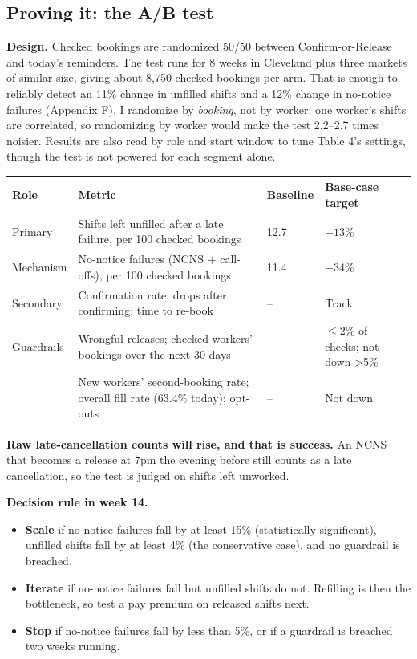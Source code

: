 \documentclass[11pt]{article}
\begin{document}
\subsection{Proving it: the A/B test}

\textbf{Design.} Checked bookings are randomized 50/50 between Confirm-or-Release and today's reminders. The test runs
for 8 weeks in Cleveland plus three markets of similar size, giving about 8,750 checked bookings per arm. That is enough
to reliably detect an 11\% change in unfilled shifts and a 12\% change in no-notice failures (Appendix F). I randomize by
\emph{booking}, not by worker: one worker's shifts are correlated, so randomizing by worker would make the test
2.2--2.7 times noisier. Results are also read by role and start window to tune Table 4's settings, though the test is
not powered for each segment alone.

\begin{center}\small
{}
\begin{tabularx}{\textwidth}{@{}lLR{1.4cm}R{2.6cm}@{}}
\toprule
Role & Metric & Baseline & Base-case target \\
\midrule
Primary & Shifts left unfilled after a late failure, per 100 checked bookings & 12.7 & $-13\%$ \\
Mechanism & No-notice failures (NCNS + call-offs), per 100 checked bookings & 11.4 & $-34\%$ \\
Secondary & Confirmation rate; drops after confirming; time to re-book & -- & Track \\
Guardrails & Wrongful releases; checked workers' bookings over the next 30 days & -- & $\le$2\% of checks; not down
\textgreater5\% \\
 & New workers' second-booking rate; overall fill rate (63.4\% today); opt-outs & -- & Not down \\
\bottomrule
\end{tabularx}
\end{center}

\textbf{Raw late-cancellation counts will rise, and that is success.} An NCNS that becomes a release at 7pm the evening
before still counts as a late cancellation, so the test is judged on shifts left unworked.

\textbf{Decision rule in week 14.}
\begin{itemize}
  \item \textbf{Scale} if no-notice failures fall by at least 15\% (statistically significant), unfilled shifts fall by
  at least 4\% (the conservative case), and no guardrail is breached.
  \item \textbf{Iterate} if no-notice failures fall but unfilled shifts do not. Refilling is then the bottleneck, so test
  a pay premium on released shifts next.
  \item \textbf{Stop} if no-notice failures fall by less than 5\%, or if a guardrail is breached two weeks running.
\end{itemize}
\end{document}
